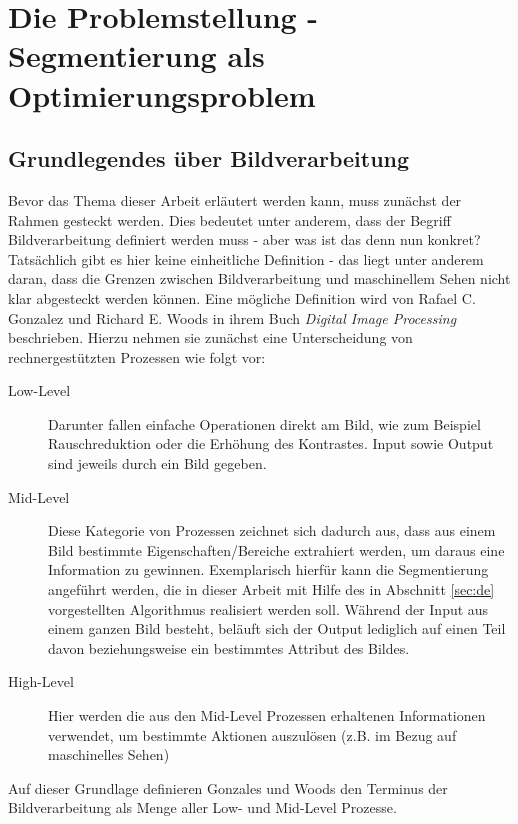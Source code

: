 \chapter{Die Problemstellung - Segmentierung als Optimierungsproblem}
\label{sec:prob}
	
	\section{Grundlegendes über Bildverarbeitung}
	\label{sec:bild-basics}
	
	Bevor das Thema dieser Arbeit erläutert werden kann, muss zunächst der Rahmen gesteckt werden. Dies bedeutet unter anderem, dass der Begriff Bildverarbeitung definiert werden muss - aber was ist das denn nun konkret? Tatsächlich gibt es hier keine einheitliche Definition - das liegt unter anderem daran, dass die Grenzen zwischen Bildverarbeitung und maschinellem Sehen nicht klar abgesteckt werden können. Eine mögliche Definition wird von Rafael C. Gonzalez und Richard E. Woods in ihrem Buch \textit{Digital Image Processing} \cite[S. 1--3]{gonzalez-woods} beschrieben. Hierzu nehmen sie zunächst eine Unterscheidung von rechnergestützten Prozessen wie folgt vor: 
	\begin{description}
		\item[Low-Level] Darunter fallen einfache Operationen direkt am Bild, wie zum Beispiel Rauschreduktion oder die Erhöhung des Kontrastes. Input sowie Output sind jeweils durch ein Bild gegeben.
		\item[Mid-Level] Diese Kategorie von Prozessen zeichnet sich dadurch aus, dass aus einem Bild bestimmte Eigenschaften/Bereiche extrahiert werden, um daraus eine Information zu gewinnen. Exemplarisch hierfür kann die Segmentierung angeführt werden, die in dieser Arbeit mit Hilfe des in Abschnitt \ref{sec:de} vorgestellten Algorithmus realisiert werden soll. Während der Input aus einem ganzen Bild besteht, beläuft sich der Output lediglich auf einen Teil davon beziehungsweise ein bestimmtes Attribut des Bildes.
		\item[High-Level] Hier werden die aus den Mid-Level Prozessen erhaltenen Informationen verwendet, um bestimmte Aktionen auszulösen (z.B. im Bezug auf maschinelles Sehen)
	\end{description}
	
	Auf dieser Grundlage definieren Gonzales und Woods \cite[S. 1--3]{gonzalez-woods} den Terminus der Bildverarbeitung als Menge aller Low- und Mid-Level Prozesse. \\
	
